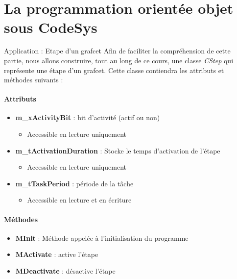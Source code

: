 \section{La programmation orientée objet sous CodeSys}


\begin{UPSTIidee}{Application : Etape d'un grafcet}
    Afin de faciliter la compréhension de cette partie, nous allons construire, tout au long de ce cours, une classe \emph{CStep} qui représente une étape d'un grafcet. Cette classe contiendra les attributs et méthodes suivants :

    \begin{minipage}{.45\linewidth}
        \paragraph{Attributs}
        \begin{itemize}
            \item \textbf{m\_xActivityBit} : bit d'activité (actif ou non)
                  \begin{itemize}
                      \item Accessible en lecture uniquement
                  \end{itemize}
            \item \textbf{m\_tActivationDuration} : Stocke le temps d'activation de l'étape
                  \begin{itemize}
                      \item Accessible en lecture uniquement
                  \end{itemize}
            \item \textbf{m\_tTaskPeriod} : période de la tâche
                  \begin{itemize}
                      \item Accessible en lecture et en écriture
                  \end{itemize}
        \end{itemize}
    \end{minipage}%
    \begin{minipage}{.45\linewidth}
        \paragraph{Méthodes}
        \begin{itemize}
            \item \textbf{MInit} : Méthode appelée à l'initialisation du programme
            \item \textbf{MActivate} : active l'étape
            \item \textbf{MDeactivate} : désactive l'étape
        \end{itemize}
    \end{minipage}

\end{UPSTIidee}

